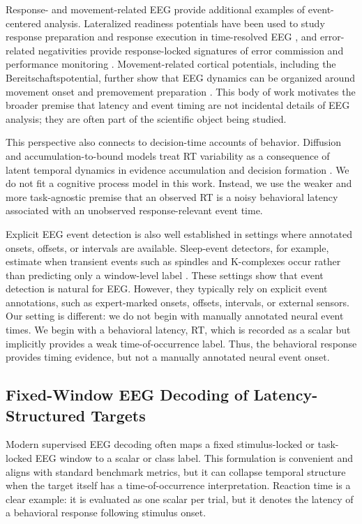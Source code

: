 \documentclass[12pt]{article}
\begin{document}
Response- and movement-related EEG provide additional examples of event-centered analysis. Lateralized readiness potentials have been used to study response preparation and response execution in time-resolved EEG \citep{Coles1989LRP}, and error-related negativities provide response-locked signatures of error commission and performance monitoring \citep{Gehring1993ErrorDetection,HolroydColes2002ERN}. Movement-related cortical potentials, including the Bereitschaftspotential, further show that EEG dynamics can be organized around movement onset and premovement preparation \citep{KornhuberDeecke1965BP,ShibasakiHallett2006BP}. This body of work motivates the broader premise that latency and event timing are not incidental details of EEG analysis; they are often part of the scientific object being studied.

This perspective also connects to decision-time accounts of behavior. Diffusion and accumulation-to-bound models treat RT variability as a consequence of latent temporal dynamics in evidence accumulation and decision formation \citep{Ratcliff2008Diffusion,OConnell2012Supramodal,Kelly2013Internal}. We do not fit a cognitive process model in this work. Instead, we use the weaker and more task-agnostic premise that an observed RT is a noisy behavioral latency associated with an unobserved response-relevant event time.

Explicit EEG event detection is also well established in settings where annotated onsets, offsets, or intervals are available. Sleep-event detectors, for example, estimate when transient events such as spindles and K-complexes occur rather than predicting only a window-level label \citep{Chambon2019DOSED,TapiaRivas2024SEED}. These settings show that event detection is natural for EEG. However, they typically rely on explicit event annotations, such as expert-marked onsets, offsets, intervals, or external sensors. Our setting is different: we do not begin with manually annotated neural event times. We begin with a behavioral latency, RT, which is recorded as a scalar but implicitly provides a weak time-of-occurrence label. Thus, the behavioral response provides timing evidence, but not a manually annotated neural event onset.

\subsection{Fixed-Window EEG Decoding of Latency-Structured Targets}
Modern supervised EEG decoding often maps a fixed stimulus-locked or task-locked EEG window to a scalar or class label. This formulation is convenient and aligns with standard benchmark metrics, but it can collapse temporal structure when the target itself has a time-of-occurrence interpretation. Reaction time is a clear example: it is evaluated as one scalar per trial, but it denotes the latency of a behavioral response following stimulus onset.
\end{document}

